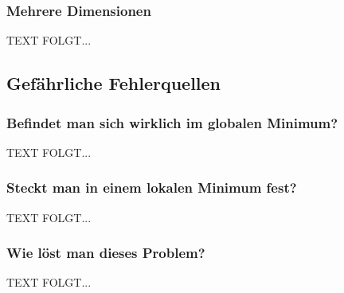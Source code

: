 \subsubsection{Mehrere Dimensionen}\label{subsec:gradientenverfahren:mehrere_dimensionen}
  TEXT FOLGT...



\subsection{Gefährliche Fehlerquellen}\label{subsec:gradientenverfahren:fehlerquellen}
\subsubsection{Befindet man sich wirklich im globalen Minimum?}\label{subsec:gradientenverfahren:fehlerquellen_globalen_minimum}
  TEXT FOLGT...

\subsubsection{Steckt man in einem lokalen Minimum fest?}\label{subsec:gradientenverfahren:fehlerquellen_lokalen_minimum}
  TEXT FOLGT...

\subsubsection{Wie löst man dieses Problem?}\label{subsec:gradientenverfahren:fehlerquellen_problem_loesen}
  TEXT FOLGT...


